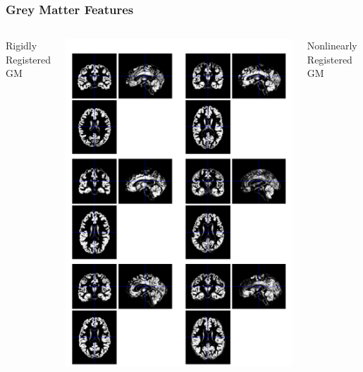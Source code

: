 \begin{frame}
\frametitle{Grey Matter Features}
\begin{columns}[c]
Rigidly Registered GM

\includegraphics[width=1\textwidth]{gm_ixi}

Nonlinearly Registered GM


\end{columns}
\end{frame}
